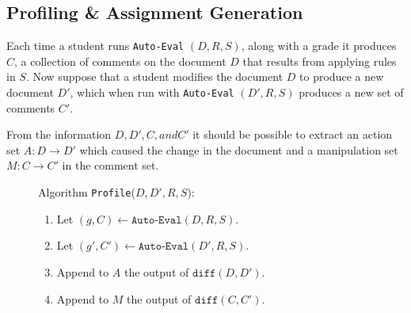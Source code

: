 \subsection{Profiling \& Assignment Generation}

Each time a student runs \texttt{Auto-Eval} $(D, R, S)$, along with a grade it
produces $C$, a collection of comments on the document $D$ that results from
applying rules in $S$.  Now suppose that a student modifies the document $D$ to
produce a new document $D'$, which when run with \texttt{Auto-Eval} $(D', R,
S)$ produces a new set of comments $C'$.  

From the information $D, D', C, and C'$ it should be possible to extract an
action set $A: D \rightarrow D'$ which caused the change in the document and a
manipulation set $M: C \rightarrow C'$ in the comment set. 

\begin{figure}
\begin{framed}

Algorithm \texttt{Profile}($D, D', R, S$):
\begin{enumerate}
    \item Let $(g,  C)  \leftarrow \texttt{Auto-Eval}(D , R, S)$.
    \item Let $(g', C') \leftarrow \texttt{Auto-Eval}(D', R, S)$.
    \item Append to $A$ the output of  $\texttt{diff}(D, D')$.
    \item Append to $M$ the output of  $\texttt{diff}(C, C')$.
\end{enumerate}

\end{framed}
\end{figure}
